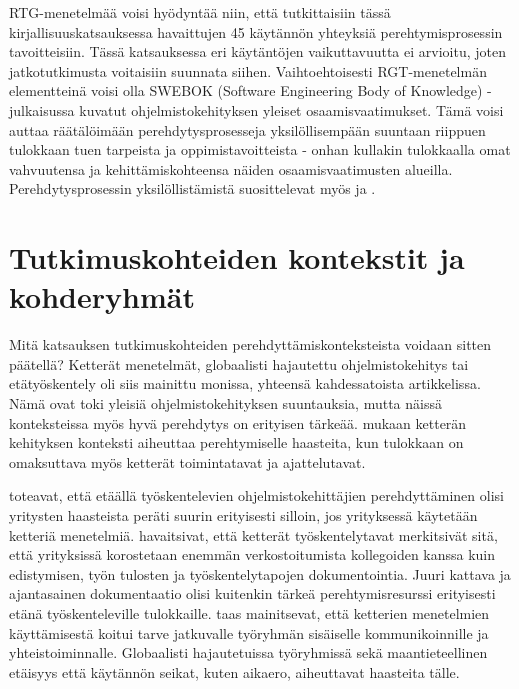 \documentclass[utf8]{gradu3}
\begin{document}
RTG-menetelmää voisi hyödyntää niin, että tutkittaisiin tässä kirjallisuuskatsauksessa havaittujen 45 käytännön yhteyksiä perehtymisprosessin tavoitteisiin. Tässä katsauksessa eri käytäntöjen vaikuttavuutta ei arvioitu, joten jatkotutkimusta voitaisiin suunnata siihen. Vaihtoehtoisesti RGT-menetelmän elementteinä voisi olla SWEBOK (Software Engineering Body of Knowledge) -julkaisussa \parencite{swebok} kuvatut ohjelmistokehityksen yleiset osaamisvaatimukset. Tämä voisi auttaa räätälöimään perehdytysprosesseja yksilöllisempään suuntaan riippuen tulokkaan tuen tarpeista ja oppimistavoitteista - onhan kullakin tulokkaalla omat vahvuutensa ja kehittämiskohteensa näiden osaamisvaatimusten alueilla. Perehdytysprosessin yksilöllistämistä suosittelevat myös \textcite{britto-ym-2017} ja \textcite{rodeghero-ym-2021}.

\section{Tutkimuskohteiden kontekstit ja kohderyhmät}

Mitä katsauksen tutkimuskohteiden perehdyttämiskonteksteista voidaan sitten päätellä? Ketterät menetelmät, globaalisti hajautettu ohjelmistokehitys tai etätyöskentely oli siis mainittu monissa, yhteensä kahdessatoista artikkelissa. Nämä ovat toki yleisiä ohjelmistokehityksen suuntauksia, mutta näissä konteksteissa myös hyvä perehdytys on erityisen tärkeää. \textcite{gregory-ym-2020} mukaan ketterän kehityksen konteksti aiheuttaa perehtymiselle haasteita, kun tulokkaan on omaksuttava myös ketterät toimintatavat ja ajattelutavat. 

\textcite{britto-ym-2017} toteavat, että etäällä työskentelevien ohjelmistokehittäjien perehdyttäminen olisi yritysten haasteista peräti suurin erityisesti silloin, jos yrityksessä käytetään ketteriä menetelmiä. \textcite{britto-ym-2017} havaitsivat, että ketterät työskentelytavat merkitsivät sitä, että yrityksissä korostetaan enemmän verkostoitumista kollegoiden kanssa kuin edistymisen, työn tulosten ja työskentelytapojen dokumentointia. Juuri kattava ja ajantasainen dokumentaatio olisi kuitenkin tärkeä perehtymisresurssi erityisesti etänä työskenteleville tulokkaille. \textcite{moe-ym-2020} taas mainitsevat, että ketterien menetelmien käyttämisestä koitui tarve jatkuvalle työryhmän sisäiselle kommunikoinnille ja yhteistoiminnalle. Globaalisti hajautetuissa työryhmissä sekä maantieteellinen etäisyys että käytännön seikat, kuten aikaero, aiheuttavat haasteita tälle.
\end{document}
